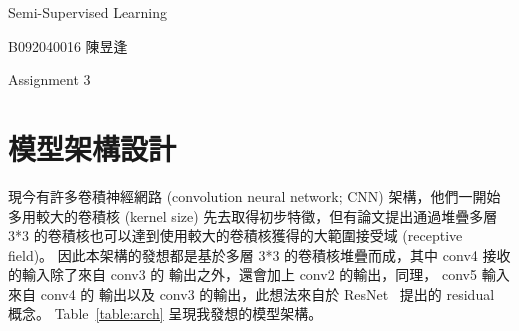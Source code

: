 \documentclass[a4paper,12pt]{article}   %
\begin{document}

\begin{center}
	{\fontsize{16pt}{12pt}\selectfont Semi-Supervised Learning}
	
\end{center}

\hfill  B092040016 陳昱逢
	
	
\begin{center}
	Assignment 3
\end{center}

\section{模型架構設計}
	現今有許多卷積神經網路 (convolution neural network; CNN) 架構，他們一開始多用較大的卷積核 (kernel size) 先去取得初步特徵，但有論文提出通過堆疊多層 3*3 的卷積核也可以達到使用較大的卷積核獲得的大範圍接受域 (receptive field)。 因此本架構的發想都是基於多層 3*3 的卷積核堆疊而成，其中 conv4 接收的輸入除了來自 conv3 的 輸出之外，還會加上 conv2 的輸出，同理， conv5 輸入來自 conv4 的 輸出以及 conv3 的輸出，此想法來自於 ResNet\ \cite{he2015deep} 提出的 residual 概念。 Table\ \ref{table:arch} 呈現我發想的模型架構。
	
	
\begin{table}[htb]
	\centering	
	\normalsize
    \newcommand{\z}{\phantom{0}}
    \caption{Architectures of my CNN model}
    \vspace{0.1\baselineskip}
	\label{table:arch}
   \vspace{0.1\baselineskip}
\end{table}
\end{document}
